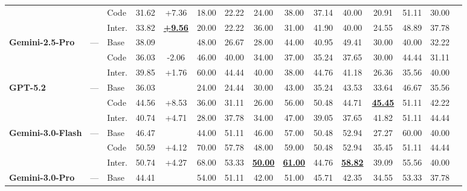 \documentclass[runningheads]{llncs}
\newcommand{\best}[1]{\textbf{\underline{#1}}}
\begin{document}
\begin{table}[htbp]
{\begin{tabular}{lll c c cccccccccc}
     &  & Code & \cellcolor{bgGain}31.62 & \cellcolor{bgGain}+7.36 & 18.00 & 22.22 & 24.00 & \cellcolor{yellow!40}38.00 & \cellcolor{yellow!40}37.14 & \cellcolor{yellow!40}40.00 & 20.91 & \cellcolor{yellow!40}51.11 & 30.00 \\
     &  & Inter. & \cellcolor{bgGain}33.82 & \cellcolor{bgGain}\best{+9.56} & 20.00 & 22.22 & \cellcolor{yellow!40}36.00 & 31.00 & \cellcolor{yellow!40}41.90 & \cellcolor{yellow!40}40.00 & 24.55 & \cellcolor{yellow!40}48.89 & 37.78 \\
    \addlinespace
    \textbf{Gemini-2.5-Pro} & --- & Base & 38.09 & & 48.00 & 26.67 & 28.00 & 44.00 & 40.95 & 49.41 & 30.00 & 40.00 & 32.22 \\
     & & Code & \cellcolor{bgLoss}36.03 & \cellcolor{bgLoss}-2.06 & 46.00 & \cellcolor{yellow!40}40.00 & 34.00 & 37.00 & 35.24 & 37.65 & 30.00 & 44.44 & 31.11 \\
    &  & Inter. & \cellcolor{bgGain}39.85 & \cellcolor{bgGain}+1.76 & \cellcolor{yellow!40}60.00 & \cellcolor{yellow!40}44.44 & \cellcolor{yellow!40}40.00 & 38.00 & 44.76 & 41.18 & 26.36 & 35.56 & 40.00 \\
    \addlinespace   
    \textbf{GPT-5.2} & --- & Base & 36.03 & & 24.00 & 24.44 & 30.00 & 43.00 & 35.24 & 43.53 & 33.64 & 46.67 & 35.56 \\
    &  & Code & \cellcolor{bgGain}44.56 & \cellcolor{bgGain}+8.53 & \cellcolor{yellow!40}36.00 & 31.11 & 26.00 & \cellcolor{yellow!40}56.00 & \cellcolor{yellow!40}50.48 & 44.71 & \cellcolor{yellow!40}\best{45.45} & 51.11 & 42.22 \\
    &  & Inter. & \cellcolor{bgGain}40.74 & \cellcolor{bgGain}+4.71 & 28.00 & \cellcolor{yellow!40}37.78 & 34.00 & 47.00 & 39.05 & 37.65 & 41.82 & 51.11 & 44.44 \\
    \addlinespace
    \textbf{Gemini-3.0-Flash} & --- & Base & 46.47 & & 44.00 & 51.11 & 46.00 & 57.00 & 50.48 & 52.94 & 27.27 & 60.00 & 40.00 \\
     & & Code & \cellcolor{bgGain}50.59 & \cellcolor{bgGain}+4.12 & \cellcolor{yellow!40}70.00 & 57.78 & 48.00 & 59.00 & 50.48 & 52.94 & 35.45 & 51.11 & 44.44 \\
     & & Inter. & \cellcolor{bgGain}50.74 & \cellcolor{bgGain}+4.27 & \cellcolor{yellow!40}68.00 & 53.33 & \best{50.00} & \best{61.00} & 44.76 & \best{58.82} & \cellcolor{yellow!40}39.09 & 55.56 & 40.00 \\
    \addlinespace
    \textbf{Gemini-3.0-Pro} & --- & Base & 44.41 & & 54.00 & 51.11 & 42.00 & 51.00 & 45.71 & 42.35 & 34.55 & 53.33 & 37.78 \\

\end{tabular}}
\end{table}
\end{document}
